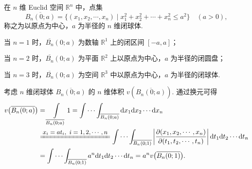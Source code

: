 \begin{example}[$n$ 维球的体积]\label{ex:10.5.12}
在 $n$ 维 Euclid 空间 $\mathbb{R}^n$ 中，点集
\[
\overline{B_n(0; a)} = \{(x_1, x_2, \cdots, x_n) \mid x_1^2 + x_2^2 + \cdots + x_n^2 \leqslant a^2\}
  \quad (a > 0),
\]
称之为以原点为中心，$a$ 为半径的 $n$ 维闭球体.

当 $n = 1$ 时，$\overline{B_n}(0; a)$ 为数轴 $\mathbb{R}^1$ 上的闭区间 $[-a, a]$；

当 $n = 2$ 时，$\overline{B_n}(0; a)$ 为平面 $\mathbb{R}^2$ 上以原点为中心，$a$ 为半径的闭圆盘；

当 $n = 3$ 时，$\overline{B_n}(0; a)$ 为空间 $\mathbb{R}^3$ 中以原点为中心，$a$ 为半径的闭球体.

考虑 $n$ 维闭球体 $\overline{B_n(0; a)}$ 的 $n$ 维体积 $v(\overline{B_n(0; a)})$. 通过换元可得
\begin{align*}
v\bigl(\overline{B_n(0; a)}\bigr)
&= \int \limits_{\overline{B_n(0; a)}} 1
 = \idotsint _{\overline{B_n(0; a)}} \mathrm{d}x_1 \mathrm{d}x_2 \cdots \mathrm{d}x_n \notag\\
&\reason{$x_i = a t_i,\ i = 1, 2, \cdots, n$}
  \idotsint _{\overline{B_n(0; 1)}}
  \left| \frac{\partial(x_1, x_2, \cdots, x_n)}{\partial(t_1, t_2, \cdots, t_n)} \right|
  \mathrm{d}t_1 \mathrm{d}t_2 \cdots \mathrm{d}t_n \notag\\
&= \idotsint _{\overline{B_n(0; 1)}} a^n \mathrm{d}t_1 \mathrm{d}t_2 \cdots \mathrm{d}t_n
 = a^n v\bigl(\overline{B_n(0; 1)}\bigr).
\end{align*}


\end{example}
